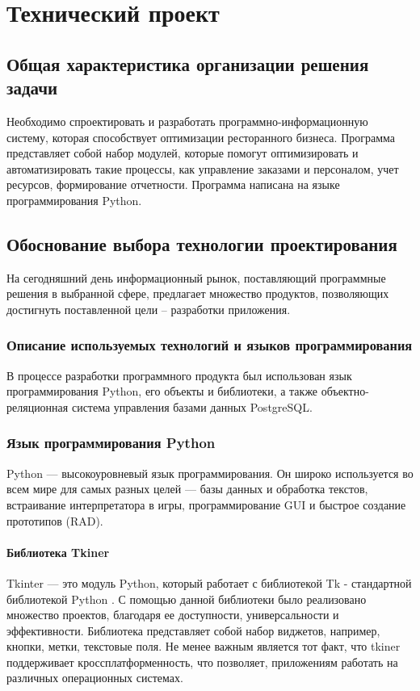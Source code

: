 \section{Технический проект}


\subsection{Общая характеристика организации решения задачи}
Необходимо спроектировать и разработать программно-информационную систему, которая способствует оптимизации ресторанного бизнеса.  
Программа представляет собой набор модулей, которые помогут оптимизировать и автоматизировать такие процессы, как управление заказами и персоналом, учет ресурсов, формирование отчетности.
Программа написана на языке программирования Python.


\subsection{Обоснование выбора технологии проектирования}
На сегодняшний день информационный рынок, поставляющий программные решения в выбранной сфере, предлагает множество продуктов, позволяющих достигнуть поставленной цели – разработки приложения.


\subsubsection{Описание используемых технологий и языков программирования}
В процессе разработки программного продукта был использован язык программирования Python, его объекты и библиотеки, а также объектно-реляционная система управления базами данных PostgreSQL.


\subsubsection{Язык программирования Python}
Python — высокоуровневый язык программирования. Он широко используется во всем мире для самых разных целей — базы данных и обработка текстов, встраивание интерпретатора в игры, программирование GUI и быстрое создание прототипов (RAD)\cite{python}.

\paragraph{Библиотека Tkiner}
Tkinter — это модуль Python, который работает с библиотекой Tk - стандартной библиотекой Python \cite{tkiner}. С помощью данной библиотеки было реализовано множество проектов, благодаря ее доступности, универсальности и эффективности. Библиотека представляет собой набор виджетов, например, кнопки, метки, текстовые поля. Не менее важным является тот факт, что tkiner поддерживает кроссплатформенность, что позволяет, приложениям работать на различных операционных системах.

